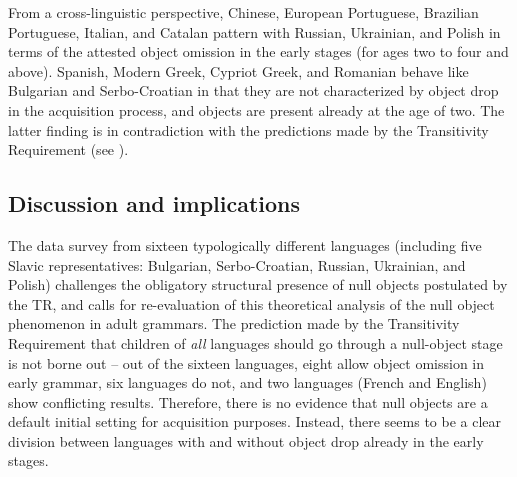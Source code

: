 \documentclass[output=paper,modfonts,newtxmath,hidelinks,]{langscibook}
\begin{document}
From a cross-linguistic perspective, 
Chinese, 
European Portuguese, Brazilian Por\-tu\-guese, 
Italian, and Catalan pattern with Russian, Ukrainian, and Polish in terms of the attested object omission in the early stages (for ages two to four and above). Spanish, Modern Greek, Cypriot Greek, and Romanian behave like Bulgarian and Serbo-Croatian in that they are not characterized by object drop in the acquisition process, and objects are present already at the age of two. The latter finding is in contradiction with the predictions made by the Transitivity Requirement (see ).

\subsection{Discussion and implications}\label{17:sec:key:3.3}

The data survey from sixteen typologically different languages (including five Slavic representatives: Bulgarian, Serbo-Croatian, Russian, Ukrainian, and Polish) challenges the obligatory structural presence of null objects postulated by the TR, and calls for re-evaluation of this theoretical analysis of the null object phenomenon in adult grammars. The prediction made by the Transitivity Requirement that children of \textit{all} languages should go through a null-object stage is not borne out -- out of the sixteen languages, eight allow object omission in early grammar, six languages do not, and two languages (French and English) show conflicting results. Therefore, there is no evidence that null objects are a default initial setting for acquisition purposes. Instead, there seems to be a clear division between languages with and without object drop already in the early stages.
\end{document}
